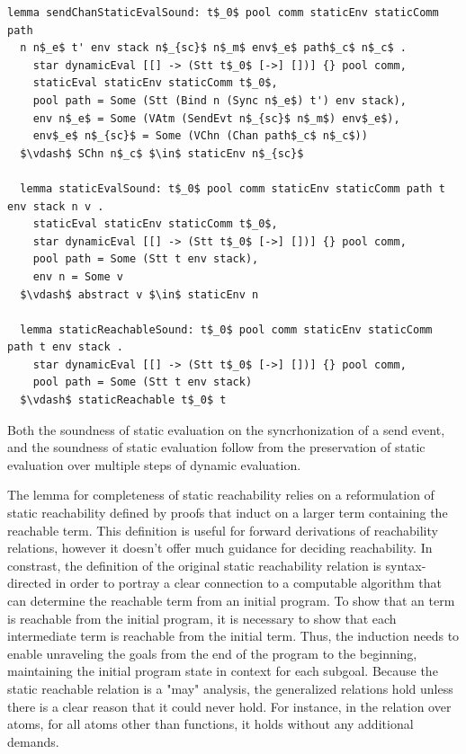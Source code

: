 \documentclass[letterpaper, 11pt]{extarticle}
\begin{document}
\begin{lstlisting}[language=logic, mathescape]
  lemma sendChanStaticEvalSound: t$_0$ pool comm staticEnv staticComm path
  n n$_e$ t' env stack n$_{sc}$ n$_m$ env$_e$ path$_c$ n$_c$ .
    star dynamicEval [[] -> (Stt t$_0$ [->] [])] {} pool comm,
    staticEval staticEnv staticComm t$_0$,
    pool path = Some (Stt (Bind n (Sync n$_e$) t') env stack),
    env n$_e$ = Some (VAtm (SendEvt n$_{sc}$ n$_m$) env$_e$),
    env$_e$ n$_{sc}$ = Some (VChn (Chan path$_c$ n$_c$))
  $\vdash$ SChn n$_c$ $\in$ staticEnv n$_{sc}$

  lemma staticEvalSound: t$_0$ pool comm staticEnv staticComm path t env stack n v .
    staticEval staticEnv staticComm t$_0$, 
    star dynamicEval [[] -> (Stt t$_0$ [->] [])] {} pool comm,
    pool path = Some (Stt t env stack), 
    env n = Some v
  $\vdash$ abstract v $\in$ staticEnv n 

  lemma staticReachableSound: t$_0$ pool comm staticEnv staticComm path t env stack .
    star dynamicEval [[] -> (Stt t$_0$ [->] [])] {} pool comm,
    pool path = Some (Stt t env stack)
  $\vdash$ staticReachable t$_0$ t 
\end{lstlisting}

Both the soundness of static evaluation on the syncrhonization of a send event,
and the soundness of static evaluation follow from
the preservation of static evaluation over multiple steps of dynamic evaluation.

The lemma for completeness of static reachability relies on a reformulation of
static reachability defined by proofs that induct on a larger term
containing the reachable term. This definition is useful for forward derivations
of reachability relations, however it doesn't offer much guidance for deciding reachability. 
In constrast, the definition of the original static reachability relation is
syntax-directed in order to portray a clear connection to
a computable algorithm that can determine the reachable term from an initial program.
To show that an term is reachable from the initial program, it is necessary to
show that each intermediate term is reachable from the initial term. Thus, the
induction needs to enable unraveling the goals from the end of the program to the beginning,
maintaining the initial program state in context for each subgoal. Because the static
reachable relation is a "may" analysis, the generalized relations hold unless there is
a clear reason that it could never hold. For instance, in the relation over atoms, for all atoms other than functions, 
it holds without any additional demands.
\end{document}
